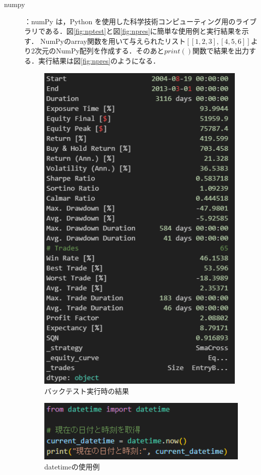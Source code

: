 \begin{description}
  \item [numpy]：numPy は，Python を使用した科学技術コンピューティング用のライブラリである\cite{numpy}．図\ref{fig:nptest}と図\ref{fig:npres}に簡単な使用例と実行結果を示す．
  NumPyのarray関数を用いて与えられたリスト$[[1, 2, 3], [4, 5, 6]]$より2次元のNumPy配列を作成する．そのあと$print()$関数で結果を出力する．実行結果は図\ref{fig:npres}のようになる．
  \begin{figure}[H]
    \centering
    \includegraphics[width=100mm]{fig/bt_res.png}
    \caption{バックテスト実行時の結果}
    \label{fig:resbt}
   \end{figure}

   \begin{figure}[H]
    \centering
    \includegraphics[width=110mm]{fig/datetime_test.png}
    \caption{datetimeの使用例}
    \label{fig:datetest}
   \end{figure}
  

\end{description}
